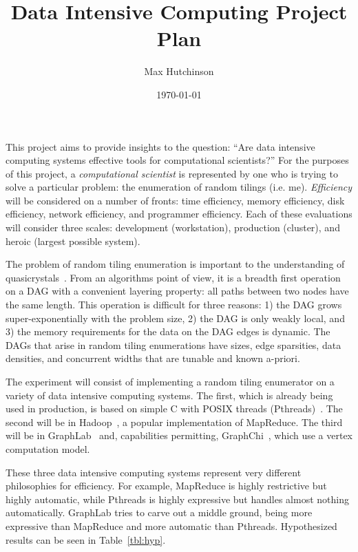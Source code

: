 \documentclass{article}
\begin{document}
\title{Data Intensive Computing Project Plan}
\author{Max Hutchinson}
\date{\today}
\maketitle

This project aims to provide insights to the question: ``Are data intensive computing systems effective tools for computational scientists?''  For the purposes of this project, a \textit{computational scientist} is represented by one who is trying to solve a particular problem: the enumeration of random tilings (i.e. me).  \textit{Efficiency} will be considered on a number of fronts: time efficiency, memory efficiency, disk efficiency, network efficiency, and programmer efficiency.  Each of these evaluations will consider three scales: development (workstation), production (cluster), and heroic (largest possible system).

The problem of random tiling enumeration is important to the understanding of quasicrystals~\cite{Shechtman1984,Levine1984}.  From an algorithms point of view, it is a breadth first operation~\cite{Dest01} on a DAG with a convenient layering property: all paths between two nodes have the same length.  This operation is difficult for three reasons: 1) the DAG grows super-exponentially with the problem size, 2) the DAG is only weakly local, and 3) the memory requirements for the data on the DAG edges is dynamic.  The DAGs that arise in random tiling enumerations have sizes, edge sparsities, data densities, and concurrent widths that are tunable and known a-priori. 

The experiment will consist of implementing a random tiling enumerator on a variety of data intensive computing systems.  The first, which is already being used in production, is based on simple C with POSIX threads (Pthreads)~\cite{Mueller1993}.  The second will be in Hadoop~\cite{Bialecki2005,Borthakur2008}, a popular implementation of MapReduce.  The third will be in GraphLab~\cite{Low2012} and, capabilities permitting, GraphChi~\cite{Kyrola2012}, which use a vertex computation model.

These three data intensive computing systems represent very different philosophies for efficiency.  For example, MapReduce is highly restrictive but highly automatic, while Pthreads is highly expressive but handles almost nothing automatically.  GraphLab tries to carve out a middle ground, being more expressive than MapReduce and more automatic than Pthreads.  Hypothesized results can be seen in Table~\ref{tbl:hyp}.
\end{document}
